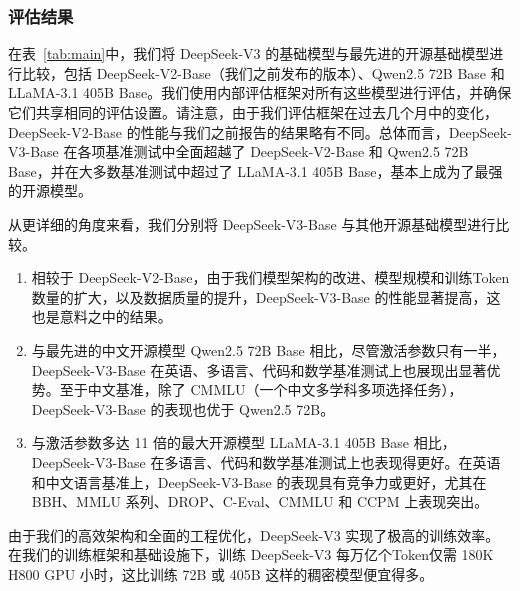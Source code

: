 \documentclass[lang=cn,a4paper,newtx]{elegantpaper}
\newcommand{\dsvii}{DeepSeek-V2}
\newcommand{\dsviii}{DeepSeek-V3}
\begin{document}


\subsubsection{评估结果}

在表~\ref{tab:main}中，我们将 \dsviii{} 的基础模型与最先进的开源基础模型进行比较，包括 \dsvii{}-Base（我们之前发布的版本）、Qwen2.5 72B Base 和 LLaMA-3.1 405B Base。我们使用内部评估框架对所有这些模型进行评估，并确保它们共享相同的评估设置。请注意，由于我们评估框架在过去几个月中的变化，\dsvii{}-Base 的性能与我们之前报告的结果略有不同。总体而言，\dsviii{}-Base 在各项基准测试中全面超越了 \dsvii{}-Base 和 Qwen2.5 72B Base，并在大多数基准测试中超过了 LLaMA-3.1 405B Base，基本上成为了最强的开源模型。

从更详细的角度来看，我们分别将 \dsviii{}-Base 与其他开源基础模型进行比较。

\begin{enumerate}
\item 相较于 \dsvii{}-Base，由于我们模型架构的改进、模型规模和训练Token数量的扩大，以及数据质量的提升，\dsviii{}-Base 的性能显著提高，这也是意料之中的结果。
\item 与最先进的中文开源模型 Qwen2.5 72B Base 相比，尽管激活参数只有一半，\dsviii{}-Base 在英语、多语言、代码和数学基准测试上也展现出显著优势。至于中文基准，除了 CMMLU（一个中文多学科多项选择任务），\dsviii{}-Base 的表现也优于 Qwen2.5 72B。
\item 与激活参数多达 11 倍的最大开源模型 LLaMA-3.1 405B Base 相比，\dsviii{}-Base 在多语言、代码和数学基准测试上也表现得更好。在英语和中文语言基准上，\dsviii{}-Base 的表现具有竞争力或更好，尤其在 BBH、MMLU 系列、DROP、C-Eval、CMMLU 和 CCPM 上表现突出。
\end{enumerate}

由于我们的高效架构和全面的工程优化，\dsviii{} 实现了极高的训练效率。在我们的训练框架和基础设施下，训练 \dsviii{} 每万亿个Token仅需 180K H800 GPU 小时，这比训练 72B 或 405B 这样的稠密模型便宜得多。
\end{document}
